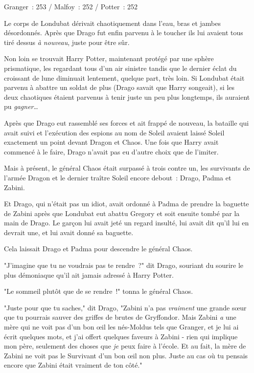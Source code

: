 \later

Granger~: 253 / Malfoy~: 252 / Potter~: 252

Le corps de Londubat dérivait chaotiquement dans l'eau, bras et jambes désordonnés. Après que Drago fut enfin parvenu à le toucher ils lui avaient tous tiré dessus \emph{à nouveau}, juste pour être sûr.

Non loin se trouvait Harry Potter, maintenant protégé par une sphère prismatique, les regardant tous d'un air sinistre tandis que le dernier éclat du croissant de lune diminuait lentement, quelque part, très loin. Si Londubat était parvenu à abattre un soldat de plus (Drago savait que Harry songeait), si les deux chaotiques étaient parvenus à tenir juste un peu plus longtemps, ils auraient pu \emph{gagner}…

Après que Drago eut rassemblé ses forces et ait frappé de nouveau, la bataille qui avait suivi et l'exécution des espions au nom de Soleil avaient laissé Soleil exactement un point devant Dragon et Chaos. Une fois que Harry avait commencé à le faire, Drago n'avait pas eu d'autre choix que de l'imiter.

Mais à présent, le général Chaos était surpassé à trois contre un, les survivants de l'armée Dragon et le dernier traître Soleil encore debout~: Drago, Padma et Zabini.

Et Drago, qui n'était pas un idiot, avait ordonné à Padma de prendre la baguette de Zabini après que Londubat eut abattu Gregory et soit ensuite tombé par la main de Drago. Le garçon lui avait jeté un regard insulté, lui avait dit qu'il lui en devrait une, et lui avait donné sa baguette.

Cela laissait Drago et Padma pour descendre le général Chaos.

"J'imagine que tu ne voudrais pas te rendre~?" dit Drago, souriant du sourire le plus démoniaque qu'il ait jamais adressé à Harry Potter.

"Le sommeil plutôt que de se rendre~!" tonna le général Chaos.

"Juste pour que tu saches," dit Drago, "Zabini n'a pas \emph{vraiment} une grande sœur que tu pourrais sauver des griffes de brutes de Gryffondor. Mais Zabini \emph{a} une mère qui ne voit pas d'un bon œil les nés-Moldus tels que Granger, et je lui ai écrit quelques mots, et j'ai offert quelques faveurs à Zabini - rien qui implique mon père, seulement des choses que \emph{je} peux faire à l'école. Et au fait, la mère de Zabini ne voit pas le Survivant d'un bon œil non plus. Juste au cas où tu pensais encore que Zabini était vraiment de ton côté."

